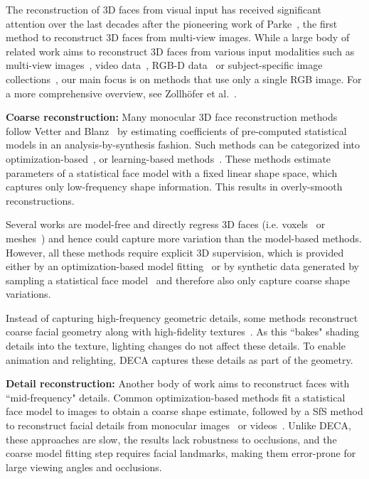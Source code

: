 \documentclass[final]{cvpr}
\newcommand{\qheading}[1]{\noindent\textbf{#1}}
\newcommand{\modelname}{DECA\xspace}
\begin{document}
The reconstruction of 3D faces from visual input has received significant attention over the last decades after the pioneering work of Parke~\cite{Parke1974}, the first method to reconstruct 3D faces from multi-view images.
While a large body of related work aims to reconstruct 3D faces from various input modalities such as multi-view images~\cite{Beeler2010,Cao2018,Pighin1998}, video data~\cite{Garrido2016,Ichim2015,Jeni2015,Shi2014,Suwajanakorn2014}, RGB-D data~\cite{Li2013,Thies2015,Weise2011} or subject-specific image collections~\cite{KemelmacherSeitz2011,Roth2016}, our main focus is on methods that use only a single RGB image.
For a more comprehensive overview, see Zollh{\"o}fer et al.~\cite{Zollhoefer2018}.

\qheading{Coarse reconstruction:}
Many monocular 3D face reconstruction methods follow Vetter and Blanz~\cite{VetterBlanz1998} by estimating coefficients of pre-computed statistical models in an analysis-by-synthesis fashion. 
Such methods can be categorized into optimization-based~\cite{AldrianSmith2013,Bas2017fitting,Blanz2002,BlanzVetter1999,Gerig2018,RomdhaniVetter2005,Thies2016}, or learning-based methods~\cite{Chang2018,Deng2019,Genova2018,Kim2018,Richardson2016,Sanyal2019,Tewari2017,AnhTran2017,Tu2019}.
These methods estimate parameters of a statistical face model with a fixed linear shape space, which captures only low-frequency shape information.
This results in overly-smooth reconstructions. 

Several works are model-free and directly regress 3D faces (i.e. voxels~\cite{Jackson2017} or meshes~\cite{Dou2017,Feng2018,Guler2017,Wei2019}) and hence could capture more variation than the model-based methods. 
However, all these methods require explicit 3D supervision, which is provided either by an optimization-based model fitting~\cite{Feng2018,Guler2017,Jackson2017,Wei2019} or by synthetic data generated by sampling a statistical face model~\cite{Dou2017} and therefore also only capture coarse shape variations. 

Instead of capturing high-frequency geometric details, some methods reconstruct coarse facial geometry along with high-fidelity textures~\cite{Gecer2019,Saito2017,Slossberg2018,Yamaguchi2018}. 
As this ``bakes" shading details into the texture, lighting changes do not affect these details.  
To enable animation and relighting, \modelname captures these details as part of the geometry.


\qheading{Detail reconstruction:}
Another body of work aims to reconstruct faces with ``mid-frequency" details.
Common optimization-based methods fit a statistical face model to images to obtain a coarse shape estimate, followed by a \ac{SfS} method to reconstruct facial details from monocular images~\cite{Jiang2018,Li2018} or videos~\cite{Garrido2016,Suwajanakorn2014}. 
Unlike \modelname, these approaches are slow, the results lack robustness to occlusions, and the coarse model fitting step requires facial landmarks, making them error-prone for large viewing angles and occlusions.
\end{document}
